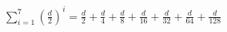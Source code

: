 \documentclass[preview]{standalone}
\begin{document}
\begin{align*}
\sum_{i=1}^{7} \left(\frac{d}{2}\right)^i =\frac{d}{2} + \frac{d}{4} + \frac{d}{8} + \frac{d}{16} + \frac{d}{32} + \frac{d}{64} + \frac{d}{128}
\end{align*}
\end{document}
